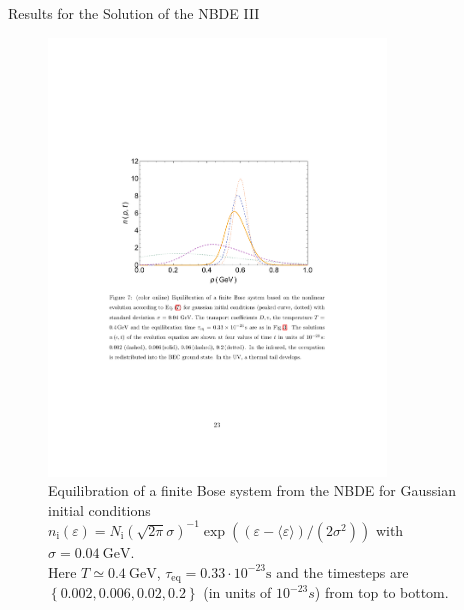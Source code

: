 \begin{frame}{Results for the Solution of the NBDE III}
\begin{figure}[H]
\centering
\includegraphics[width=0.8\textwidth]{figures/nbde_gaussian}
\caption{Equilibration of a finite Bose system from the NBDE for Gaussian initial conditions $n_{\mathrm{i}}(\varepsilon) = N_{\mathrm{i}}\left(\sqrt{2\pi}\sigma\right)^{-1}\exp\left((\varepsilon - \langle\varepsilon\rangle)/(2\sigma^2)\right)$ with $\sigma = 0.04\ \mathrm{GeV}$. \cite{Wolschin2018} \\ 
Here $T\simeq 0.4\ \mathrm{GeV}$, $\tau_{\mathrm{eq}} =  0.33\cdot 10^{-23} \mathrm{s}$ and the timesteps are $\left\{0.002, 0.006, 0.02, 0.2\right\}$ (in units of $10^{-23}s$) from top to bottom.}
\end{figure}
\end{frame}



